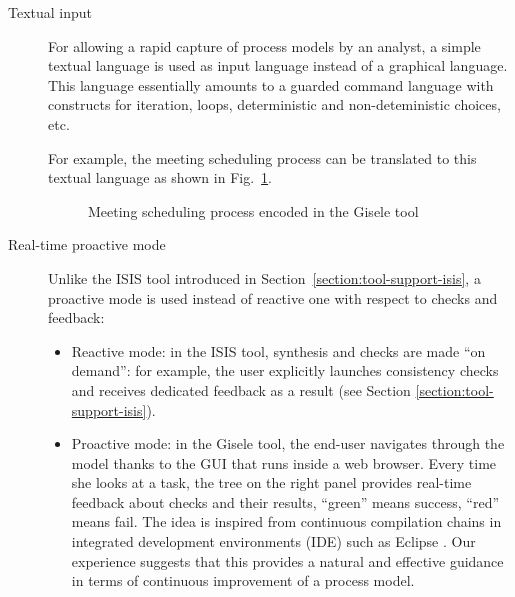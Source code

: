 \begin{description}
\item[Textual input] For allowing a rapid capture of process models by an analyst, a simple textual language is used as input language instead of a graphical language. This language essentially amounts to a guarded command language with constructs for iteration, loops, deterministic and non-deteministic choices, etc.

For example, the meeting scheduling process can be translated to this textual language as shown in Fig.~\ref{image:meeting-scheduling-gis}.

\begin{figure}[H]
\centering{}
  \caption{Meeting scheduling process encoded in the Gisele tool\label{image:meeting-scheduling-gis}}
\end{figure}

\item[Real-time proactive mode] Unlike the ISIS tool introduced in Section~\ref{section:tool-support-isis}, a proactive mode is used instead of reactive one with respect to checks and feedback:
\begin{itemize}
\item Reactive mode: in the ISIS tool, synthesis and checks are made ``on demand'': for example, the user explicitly launches consistency checks and receives dedicated feedback as a result (see Section \ref{section:tool-support-isis}).
\item Proactive mode: in the Gisele tool, the end-user navigates through the model thanks to the GUI that runs inside a web browser. Every time she looks at a task, the tree on the right panel provides real-time feedback about checks and their results, ``green'' means success, ``red'' means fail. The idea is inspired from continuous compilation chains in integrated development environments (IDE) such as Eclipse \cite{Gamma:2003}. Our experience suggests that this provides a natural and effective guidance in terms of continuous improvement of a process model. 

\end{itemize} 
\end{description}

